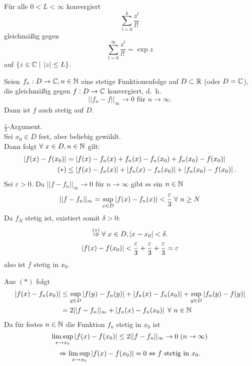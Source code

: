 \documentclass[../ana1.tex]{subfiles}
\begin{document}
\begin{bsp}
    Für alle \( 0 < L < \infty \) konvergiert 
    \[ \sum_{l=0}^k \frac{z^l}{l!} \]
    gleichmäßig gegen
    \[ \sum_{l=0}^\infty \frac{z^l}{l!} = \exp z \]
    auf \( \{ z \in \mathbb{C} \; \vert \; \left|z\right| \leq L \} \).
\end{bsp}
\begin{satz}\label{satz:glmStetigUStetig}
    Seien \( f_n : D \rightarrow \mathbb{C}, n\in\mathbb{N} \) eine 
    stetige Funktionenfolge auf \( D \subset \mathbb{R} \) 
    (oder \( D = \mathbb{C} \)), die gleichmäßig gegen 
    \( f: D \rightarrow \mathbb{C} \) konvergiert, d.\ h.\ 
    \[ ||f_n - f||_\infty \rightarrow 0 
    \text{ für } n\rightarrow\infty. \]
    Dann ist \(f\) auch stetig auf \(D\).
\end{satz}
\begin{bew}
    \( \frac{\varepsilon}{3} \)-Argument. \\
    Sei \( x_0 \in D \) fest, aber beliebig gewählt. \\
    Dann folgt \( \forall \, x \in D, n \in \N \) gilt:
    \begin{align*}
        \left| f(x) - f(x_0) \right| 
        &= \left| f(x) - f_n(x) + f_n(x) - f_n(x_0) 
        + f_n(x_0) - f(x_0) \right| \\
        (*) &\leq \left| f(x) - f_n(x) \right| + \left|f_n(x) - f_n(x_0)\right| 
        + \left|f_n(x_0) - f(x_0)\right|.
    \end{align*}
    Sei \( \varepsilon > 0 \).
    Da \( ||f-f_n||_\infty \rightarrow 0 \) für 
    \(n \rightarrow \infty \) gibt es ein \( n \in \mathbb{N} \)
    \[ ||f-f_n||_\infty = \underset{x \in D}{\sup} 
    \abs{f(x)-f_n(x)} < \frac{\varepsilon}{3} 
    \; \forall \, n \geq N \]        
    Da \( f_N \) stetig ist, existiert somit \( \delta > 0 \): 
    \[ \overset{(*)}{\Rightarrow} \forall \, x\in D, 
    \abs{x-x_0} < \delta. \]
    \[ \left| f(x) - f(x_0) \right| < \frac{\varepsilon}{3} 
    + \frac{\varepsilon}{3} + \frac{\varepsilon}{3}  = \varepsilon \]
    also ist \( f \) stetig in \( x_0 \). \\            
\end{bew}
\begin{bew} 
    Aus \( (*) \) folgt 
    \begin{align*}
        \abs{f(x) - f_n(x_0)} &\leq \underset{y \in D}{\sup}
        \abs{f(y)-f_n(y)} + \abs{f_n(x) - f_n(x_0)}
        + \underset{y \in D}{\sup} \abs{f_n(y) - f(y)} \\
        &= 2 ||f-f_n||_\infty + \abs{f_n(x) -f_n(x_0)} 
        \; \forall \, n \in \N 
    \end{align*}
    Da für festes \(n \in \mathbb{N} \) die Funktion \( f_n \) stetig
    in \( x_0 \) ist
    \[ \limsup\limits_{x\rightarrow x_0} \left|f(x)-f(x_0)\right|
    \leq 2 ||f-f_n||_\infty \rightarrow 0 \; (n \rightarrow \infty) \]    
    \[ \Rightarrow \limsup\limits_{x\rightarrow x_0} 
    \left| f(x) - f(x_0)\right| = 0 \Leftrightarrow 
    f \text{ stetig in } x_0. \]
\end{bew}
\end{document}
